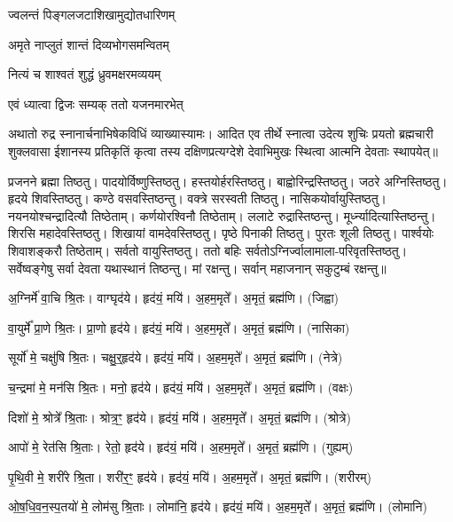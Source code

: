 {ज्वलन्तं पिङ्गलजटाशिखामुद्योतधारिणम्}

{अमृते नाप्लुतं शान्तं दिव्यभोगसमन्वितम्}

{नित्यं च शाश्वतं शुद्धं ध्रुवमक्षरमव्ययम्}

{एवं ध्यात्वा द्विजः सम्यक् ततो यजनमारभेत्}

अथातो रुद्र स्नानार्चनाभिषेकविधिं व्याख्यास्यामः। आदित एव तीर्थे स्नात्वा उदेत्य शुचिः
प्रयतो ब्रह्मचारी शुक्लवासा ईशानस्य प्रतिकृतिं कृत्वा तस्य दक्षिणप्रत्यग्देशे देवाभिमुखः स्थित्वा आत्मनि देवताः स्थापयेत्॥

प्रजनने ब्रह्मा तिष्ठतु। पादयोर्विष्णुस्तिष्ठतु। 
हस्तयोर्हरस्तिष्ठतु। बाह्वोरिन्द्रस्\-तिष्ठतु। 
जठरे अग्निस्तिष्ठतु। हृदये शिवस्तिष्ठतु। 
कण्ठे वसवस्तिष्ठन्तु। वक्त्रे सरस्वती तिष्ठतु। 
नासिकयोर्\-वायुस्तिष्ठतु। नयनयोश्चन्द्रादित्यौ तिष्ठेताम्। 
कर्णयोरश्विनौ तिष्ठेताम्। ललाटे रुद्रास्तिष्ठन्तु। 
मूर्ध्न्यादित्यास्तिष्ठन्तु। शिरसि महादेवस्तिष्ठतु। 
शिखायां वामदेवस्तिष्ठतु। पृष्ठे पिनाकी तिष्ठतु। 
पुरतः शूली तिष्ठतु। पार्श्वयोः शिवाशङ्करौ तिष्ठेताम्। 
सर्वतो वायुस्तिष्ठतु। ततो बहिः सर्वतोऽग्निर्ज्वालामाला-परिवृतस्तिष्ठतु।
सर्वेष्वङ्गेषु सर्वा देवता यथास्थानं तिष्ठन्तु। मां रक्षन्तु।
\lbrack सर्वान् महाजनान् सकुटुम्बं रक्षन्तु॥\rbrack

अ॒ग्निर्मे॑ वा॒चि श्रि॒तः। वाग्घृद॑ये। हृद॑यं॒ मयि॑। अ॒हम॒मृते᳚। अ॒मृतं॒ ब्रह्म॑णि। (जिह्वा)

वा॒युर्मे᳚ प्रा॒णे श्रि॒तः। प्रा॒णो हृद॑ये। हृद॑यं॒ मयि॑। अ॒हम॒मृते᳚। अ॒मृतं॒ ब्रह्म॑णि। (नासिका)

सूर्यो॑ मे॒ चक्षु॑षि श्रि॒तः। चक्षु॒र्‌॒हृद॑ये। हृद॑यं॒ मयि॑। अ॒हम॒मृते᳚। अ॒मृतं॒ ब्रह्म॑णि। (नेत्रे)

च॒न्द्रमा॑ मे॒ मन॑सि श्रि॒तः। मनो॒ हृद॑ये। हृद॑यं॒ मयि॑। अ॒हम॒मृते᳚। अ॒मृतं॒ ब्रह्म॑णि। (वक्षः)

दिशो॑ मे॒ श्रोत्रे᳚ श्रि॒ताः। श्रोत्र॒ꣳ॒ हृद॑ये। हृद॑यं॒ मयि॑। अ॒हम॒मृते᳚। अ॒मृतं॒ ब्रह्म॑णि। (श्रोत्रे)

आपो॑ मे॒ रेत॑सि श्रि॒ताः। रेतो॒ हृद॑ये। हृद॑यं॒ मयि॑। अ॒हम॒मृते᳚। अ॒मृतं॒ ब्रह्म॑णि। (गुह्यम्)

पृ॒थि॒वी मे॒ शरी॑रे श्रि॒ता। शरी॑र॒ꣳ॒ हृद॑ये। हृद॑यं॒ मयि॑। अ॒हम॒मृते᳚। अ॒मृतं॒ ब्रह्म॑णि। (शरीरम्)

ओ॒ष॒धि॒व॒न॒स्प॒तयो॑ मे॒ लोम॑सु श्रि॒ताः। लोमा॑नि॒ हृद॑ये। हृद॑यं॒ मयि॑। अ॒हम॒मृते᳚। अ॒मृतं॒ ब्रह्म॑णि। (लोमानि)

